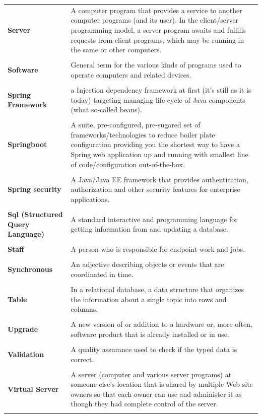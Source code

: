 \documentclass[a4paper,11pt,twoside]{report}
\theoremstyle{definition}
\begin{document}
\begin{longtable}{p{4cm} p{11cm}}
\textbf{Server} & A computer program that provides a service to another computer programs (and its user). In the client/server programming model, a server program awaits and fulfills requests from client programs, which may be running in the same or other computers.\\ \\
\textbf{Software} & General term for the various kinds of programs used to operate computers and related devices.\\ \\
\textbf{Spring Framework} & a Injection dependency framework at first (it's still as it is today) targeting managing life-cycle of Java components (what so-called beans). \\ \\
\textbf{Springboot} & A suite, pre-configured, pre-sugared set of frameworks/technologies to reduce boiler plate configuration providing you the shortest way to have a Spring web application up and running with smallest line of code/configuration out-of-the-box. \\ \\
\textbf{Spring security} & A Java/Java EE framework that provides authentication, authorization and other security features for enterprise applications.\\ \\
\textbf{Sql (Structured Query Language)} & A standard interactive and programming language for getting information from and updating a database.\\ \\
\textbf{Staff} & A person who is responsible for endpoint work and jobs.\\ \\
\textbf{Synchronous} & An adjective describing objects or events that are coordinated in time.\\ \\
\textbf{Table} & In a relational database, a data structure that organizes the information about a single topic into rows and columns.\\ \\
\textbf{Upgrade} & A new version of or addition to a hardware or, more often, software product that is already installed or in use.\\ \\
\textbf{Validation} & A quality assurance used to check if the typed data is correct.\\ \\
\textbf{Virtual Server} & A server (computer and various server programs) at someone else's location that is shared by multiple Web site owners so that each owner can use and administer it as though they had complete control of the server.\\ \\

\end{longtable}
\end{document}
